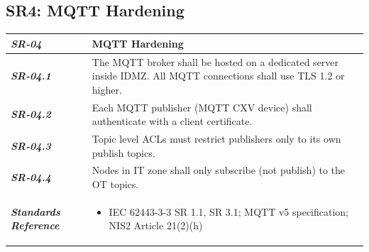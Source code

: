 \documentclass[11pt,a4paper]{article}
\begin{document}
\subsection{SR4: MQTT Hardening}\label{SR4}
\begin{tabularx}{\textwidth}{>{\bfseries}p{2.5cm} X}
    \textit{SR-04} & \textbf{MQTT Hardening} \vspace{0.5em}\\
\toprule
\textit{SR-04.1} &
    The MQTT broker shall be hosted on a dedicated server inside IDMZ. All MQTT connections shall use TLS 1.2 or higher.
    \vspace{0.5em}
\\
\textit{SR-04.2} &
    Each MQTT publisher (MQTT CXV device) shall authenticate with a client certificate.
    \vspace{0.5em}
    \\
\textit{SR-04.3} &
    Topic level ACLs must restrict publishers only to its own publish topics.
    \vspace{0.5em}
    \\
\textit{SR-04.4} &
    Nodes in IT zone shall only subscribe (not publish) to the OT topics.
    \vspace{0.5em}
    \\
\midrule
    \textit{Standards Reference} &
\begin{itemize}[label=-, noitemsep, topsep=0pt, leftmargin=*]
    \item IEC 62443-3-3 SR 1.1, SR 3.1; MQTT v5 specification; NIS2 Article 21(2)(h)
\end{itemize} \vspace{1em} \\ 
\end{tabularx}
\vspace{2em}

\end{document}
